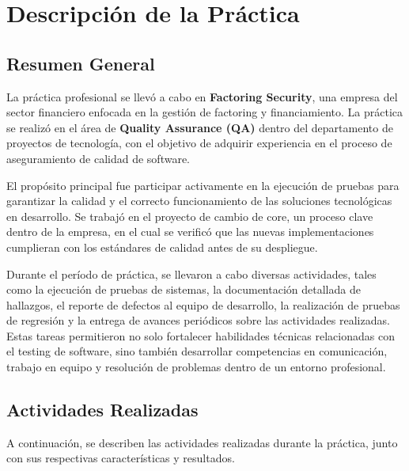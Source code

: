 \documentclass[12pt,a4paper]{report}
\begin{document}
\bigskip

\section{Descripción de la Práctica}

\subsection{Resumen General}

La práctica profesional se llevó a cabo en \textbf{Factoring Security}, una empresa del sector financiero enfocada en la gestión de factoring y financiamiento. La práctica se realizó en el área de \textbf{Quality Assurance (QA)} dentro del departamento de proyectos de tecnología, con el objetivo de adquirir experiencia en el proceso de aseguramiento de calidad de software.

El propósito principal fue participar activamente en la ejecución de pruebas para garantizar la calidad y el correcto funcionamiento de las soluciones tecnológicas en desarrollo. Se trabajó en el proyecto de cambio de core, un proceso clave dentro de la empresa, en el cual se verificó que las nuevas implementaciones cumplieran con los estándares de calidad antes de su despliegue.

Durante el período de práctica, se llevaron a cabo diversas actividades, tales como la ejecución de pruebas de sistemas, la documentación detallada de hallazgos, el reporte de defectos al equipo de desarrollo, la realización de pruebas de regresión y la entrega de avances periódicos sobre las actividades realizadas. Estas tareas permitieron no solo fortalecer habilidades técnicas relacionadas con el testing de software, sino también desarrollar competencias en comunicación, trabajo en equipo y resolución de problemas dentro de un entorno profesional.

\subsection{Actividades Realizadas}

A continuación, se describen las actividades realizadas durante la práctica, junto con sus respectivas características y resultados.
\end{document}

